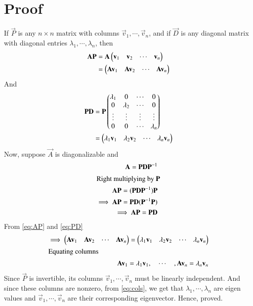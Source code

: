 \documentclass[journal,12pt,twocolumn]{IEEEtran}
\begin{document}
\section{Proof}
If $\vec{P}$ is	any $n\times n$ matrix	with	columns $\vec{v}_1,\cdots,\vec{v}_n$, and if $\vec{D}$ is any diagonal matrix with diagonal entries $\lambda_1,\cdots, \lambda_n$, then
\begin{align}
    \vec{A}\vec{P} & = \vec{A}\myvec{\vec{v}_1 & \vec{v }_2 & \cdots & \vec{v}_n} \\ & = \myvec{\vec{A}\vec{v}_1 & \vec{A}\vec{v }_2 & \cdots & \vec{A}\vec{v}_n}\label{eq:AP}
\end{align}
And
\begin{align}
    \vec{P}\vec{D} & = \vec{P}\myvec{\lambda_1 & 0 & \cdots & 0 \\ 0 & \lambda_2 & \cdots & 0 \\
    \vdots & \vdots & \vdots & \vdots \\
    0 & 0 & \cdots & \lambda_n}\\ & = \myvec{\lambda_1\vec{v}_1 & \lambda_2\vec{v}_2 & \cdots & \lambda_n\vec{v}_n}\label{eq:PD}
\end{align}
Now, suppose $\vec{A}$ is diagonalizable and
\begin{align}
    \vec{A} = \vec{P}\vec{D}\vec{P}^{-1}\\
    \intertext{Right multiplying by $\vec{P}$}
    \vec{A}\vec{P}= (\vec{P}\vec{D}\vec{P}^{-1})\vec{P}\\
    \implies\vec{A}\vec{P}= \vec{P}\vec{D}(\vec{P}^{-1}\vec{P})\\
    \implies \vec{A}\vec{P}= \vec{P}\vec{D}
\end{align}
From \eqref{eq:AP} and \eqref{eq:PD}
\begin{align}
    \implies\myvec{\vec{A}\vec{v}_1 & \vec{A}\vec{v}_2 & \cdots & \vec{A}\vec{v}_n} = \myvec{\lambda_1\vec{v}_1 & \lambda_2\vec{v}_2 & \cdots & \lambda_n\vec{v}_n}\\
    \intertext{Equating columns}
    \vec{A}\vec{v}_1 = \lambda_1\vec{v}_1,\quad \cdots \quad,\vec{A}\vec{v}_n = \lambda_n\vec{v}_n \label{eq:cols}
\end{align}
Since $\vec{P}$ is invertible, its columns $\vec{v}_1,\cdots,\vec{v}_n$ must be linearly independent. And since these columns are nonzero, from \eqref{eq:cols}, we get that $\lambda_1,\cdots, \lambda_n$ are eigen values and $\vec{v}_1,\cdots,\vec{v}_n$ are their corresponding eigenvector. Hence, proved.
\end{document}

